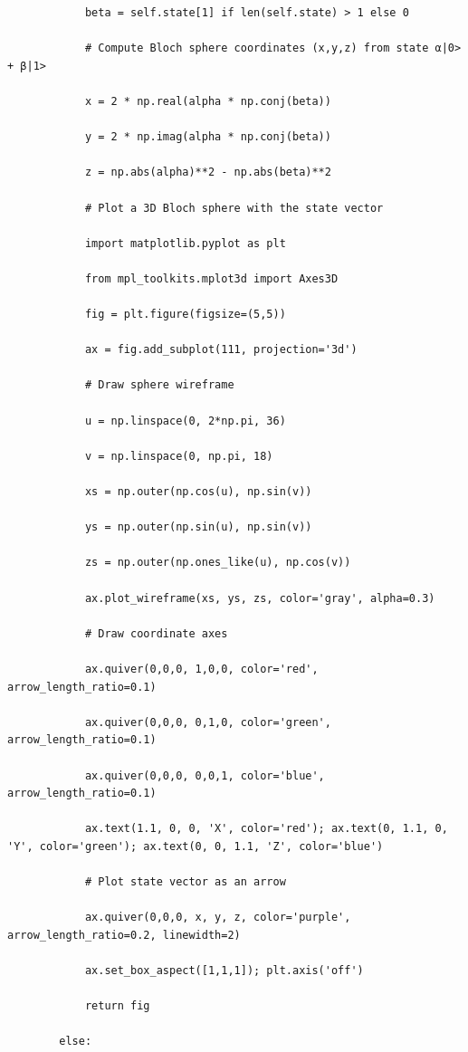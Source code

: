 \documentclass{beamer}
\begin{document}
\begin{frame}
\begin{verbatim}
            beta = self.state[1] if len(self.state) > 1 else 0

            # Compute Bloch sphere coordinates (x,y,z) from state α|0> + β|1>

            x = 2 * np.real(alpha * np.conj(beta))

            y = 2 * np.imag(alpha * np.conj(beta))

            z = np.abs(alpha)**2 - np.abs(beta)**2

            # Plot a 3D Bloch sphere with the state vector

            import matplotlib.pyplot as plt

            from mpl_toolkits.mplot3d import Axes3D

            fig = plt.figure(figsize=(5,5))

            ax = fig.add_subplot(111, projection='3d')

            # Draw sphere wireframe

            u = np.linspace(0, 2*np.pi, 36)

            v = np.linspace(0, np.pi, 18)

            xs = np.outer(np.cos(u), np.sin(v))

            ys = np.outer(np.sin(u), np.sin(v))

            zs = np.outer(np.ones_like(u), np.cos(v))

            ax.plot_wireframe(xs, ys, zs, color='gray', alpha=0.3)

            # Draw coordinate axes

            ax.quiver(0,0,0, 1,0,0, color='red', arrow_length_ratio=0.1)

            ax.quiver(0,0,0, 0,1,0, color='green', arrow_length_ratio=0.1)

            ax.quiver(0,0,0, 0,0,1, color='blue', arrow_length_ratio=0.1)

            ax.text(1.1, 0, 0, 'X', color='red'); ax.text(0, 1.1, 0, 'Y', color='green'); ax.text(0, 0, 1.1, 'Z', color='blue')

            # Plot state vector as an arrow

            ax.quiver(0,0,0, x, y, z, color='purple', arrow_length_ratio=0.2, linewidth=2)

            ax.set_box_aspect([1,1,1]); plt.axis('off')

            return fig

        else:


\end{verbatim}
\end{frame}
\end{document}
